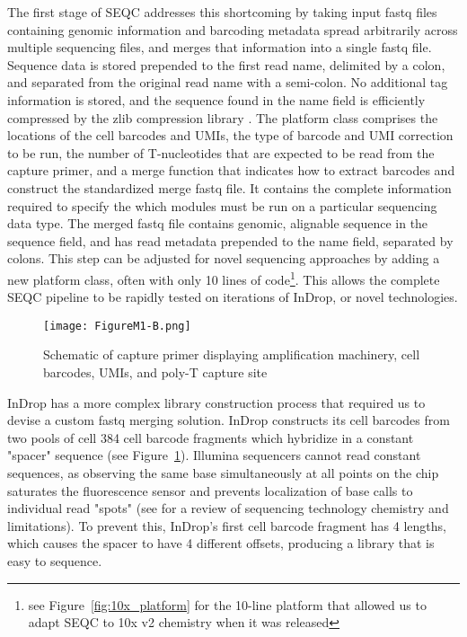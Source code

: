 The first stage of SEQC addresses this shortcoming by taking input fastq files containing genomic information and barcoding metadata spread arbitrarily across multiple sequencing files, and merges that information into a single fastq file. 
Sequence data is stored prepended to the first read name, delimited by a colon, and separated from the original read name with a semi-colon. %
No additional tag information is stored, and the sequence found in the name field is efficiently compressed by the zlib compression library \citep{Gailly2004}.
The platform class comprises the locations of the cell barcodes and UMIs, the type of barcode and UMI correction to be run, the number of T-nucleotides that are expected to be read from the capture primer, and a merge function that indicates how to extract barcodes and construct the standardized merge fastq file. 
It contains the complete information required to specify the which modules must be run on a particular sequencing data type. 
The merged fastq file contains genomic, alignable sequence in the sequence field, and has read metadata prepended to the name field, separated by colons. This step can be adjusted for novel sequencing approaches by adding a new platform class, often with only 10 lines of code\footnote{see Figure~\ref{fig:10x_platform} for the 10-line platform that allowed us to adapt SEQC to 10x v2 chemistry when it was released}. %
This allows the complete SEQC pipeline to be rapidly tested on iterations of InDrop, or novel technologies.

\begin{figure}
\centering
\texttt{[image: FigureM1-B.png]}
\caption{Schematic of capture primer displaying amplification machinery, cell barcodes, UMIs,
         and poly-T capture site}
\label{fig:m1b}
\end{figure}

InDrop has a more complex library construction process that required us to devise a custom fastq merging solution.
InDrop constructs its cell barcodes from two pools of cell 384 cell barcode fragments which hybridize in a constant "spacer" sequence (see Figure~\ref{fig:m1b}).
Illumina sequencers cannot read constant sequences, as observing the same base simultaneously at all points on the chip saturates the fluorescence sensor and prevents localization of base calls to individual read "spots" (see \cite{Metzker2010} for a review of sequencing technology chemistry and limitations). 
To prevent this, InDrop's first cell barcode fragment has 4 lengths, which causes the spacer to have 4 different offsets, producing a library that is easy to sequence. 

